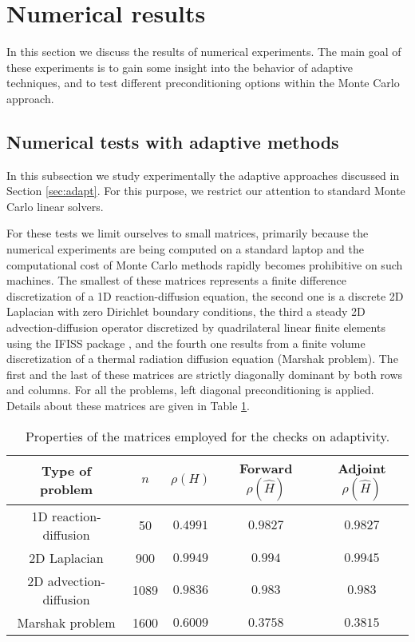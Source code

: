 \documentclass[final,leqno,onefignum,onetabnum]{siamltex1213}
\begin{document}
\section{Numerical results}
\label{sec:results}

In this section we discuss the results of numerical experiments. The main goal
of these experiments is to gain some insight into the behavior of adaptive
techniques, and to test different preconditioning options within the
Monte Carlo approach.

\subsection{Numerical tests with adaptive methods}

In this subsection we study experimentally the
adaptive approaches discussed in Section \ref{sec:adapt}.
For this purpose, we restrict our attention to standard Monte Carlo linear
solvers.

For these tests we limit ourselves
to small matrices, primarily because the numerical experiments are
being computed on a standard laptop and the computational cost of
Monte Carlo methods rapidly becomes prohibitive on such machines.
The smallest of these matrices represents a finite
difference discretization of a 1D reaction-diffusion equation,
the second one is a discrete 2D Laplacian with zero Dirichlet boundary
conditions, the third a steady 2D advection-diffusion operator discretized
by quadrilateral linear finite elements using the IFISS package \cite{ifiss},
and the fourth one
results from a finite volume discretization of
a thermal radiation diffusion equation (Marshak problem). The first and the last of these
matrices are strictly diagonally dominant by both rows and columns.
For all the problems, left diagonal preconditioning is applied.
Details about these matrices are given in Table
\ref{table_data}.

\begin{table}[!t]
\centering
\begin{tabular}{|c|c|c|c|c|}
\hline
\textbf{Type of problem} & $n$ &
$\rho(H)$&Forward $\rho(\hat{H})$&Adjoint $\rho(\hat{H})$\\
\hline
1D reaction-diffusion & 50 & $0.4991$ & $0.9827$ & $0.9827$\\
\hline
2D Laplacian & 900 & $0.9949$ & $0.994$ & $0.9945$\\
\hline
2D advection-diffusion & 1089 &$0.9836$ & $0.983$ & $0.983$ \\
\hline
Marshak problem & 1600 & $0.6009$ & $0.3758$ & $ 0.3815$ \\
\hline
\end{tabular}
\caption{Properties of the matrices employed for the checks on adaptivity.}
\label{table_data}
\end{table}
\end{document}
